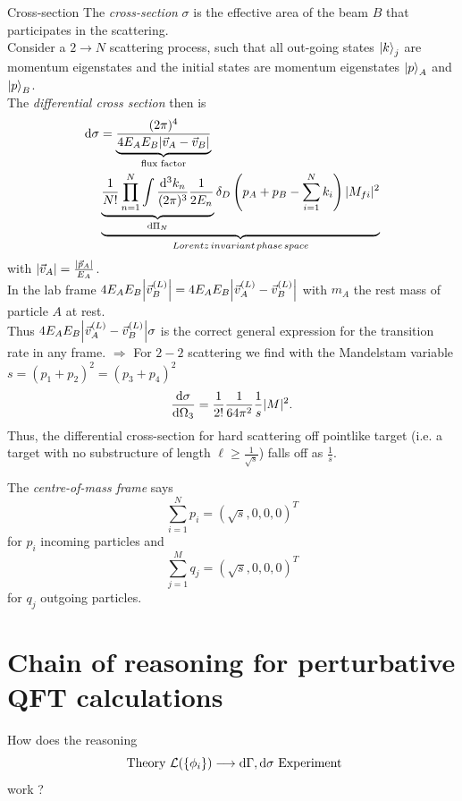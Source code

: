 \begin{mybox}{Cross-section}
	The \emph{cross-section} $\sigma$ is the effective area of the beam $B$ that participates in the scattering.\\
	Consider a $2 \rightarrow N$ scattering process, such that all out-going states $\ket{k}_j$ are momentum eigenstates and the initial states are momentum eigenstates $\ket{p}_A$ and $\ket{p}_B$.\\
	The \emph{differential cross section} then is
	\begin{align}
				\mathrm{d} \sigma &= \underbrace{\frac{(2 \pi)^4}{4 E_A E_B \abs{\vec{v}_A-\vec{v}_B}}}_{ \text{flux factor}}  \\\
				&\underbrace{\underbrace{ \frac{1}{N!} \prod_{n=1}^{N} \int \frac{\mathrm{d}^3 k_n}{(2 \pi)^3}\frac{1}{2 E_n}  	}_{\mathrm{d} \Pi_N} \delta_D \left(p_A+p_B-\sum_{i=1}^{N} k_i\right) |M_{fi}|^2}_{Lorentz\, invariant\, phase\,space} \nonumber 
	\end{align}
	with $\abs{\vec{v}_A} = \frac{\abs{\vec{p}_A}}{E_A}$.\\
	In the lab frame $4 E_A E_B \abs{\vec{v}^{(L)}_B} = 4 E_A E_B \abs{\vec{v}^{(L)}_A-\vec{v}^{(L)}_B}$ with $m_A$ the rest mass of particle $A$ at rest.\\
	Thus $4 E_A E_B \abs{\vec{v}^{(L)}_A - \vec{v}^{(L)}_B} \sigma$ is the correct general expression for the transition rate in any frame.
	$\Rightarrow$ For $2-2$ scattering we find with the Mandelstam variable $s =(p_1+p_2)^2 = (p_3+p_4)^2$ 
	\begin{equation}
			\frac{\mathrm{d} \sigma}{\mathrm{d} \Omega_3} = \frac{1}{2!} \frac{1}{64 \pi^2} \frac{1}{s} |M|^2.
	\end{equation}
	Thus, the differential cross-section for hard scattering off pointlike target (i.e. a target with no substructure of length $\ell \geq \frac{1}{\sqrt{s}}$) falls off as $\frac{1}{s}$.
\end{mybox}
The \emph{centre-of-mass frame} says
\begin{equation}
	\sum_{i=1}^{N} p_i = (\sqrt{s},0,0,0)^T
\end{equation}
for $p_i$ incoming particles and
\begin{equation}
	\sum_{j=1}^{M} q_j = (\sqrt{s},0,0,0)^T
\end{equation}
for $q_j$ outgoing particles.



\section{Chain of reasoning for perturbative QFT calculations}
How does the reasoning 
\begin{equation}
	\text{ Theory  } \mathcal{L}(\{\phi_i \}) \longrightarrow \mathrm{d} \Gamma, \mathrm{d} \sigma \text{ Experiment}
\end{equation}
work ?

